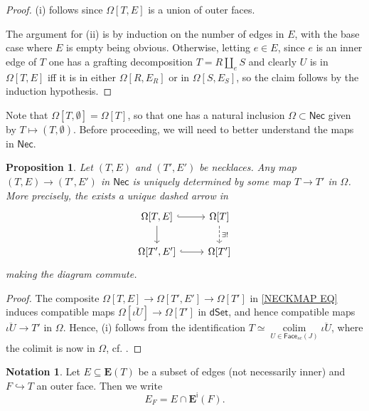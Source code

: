 \documentclass[a4paper,10pt
,draft
]{article}%
\numberwithin{equation}{section}
\numberwithin{figure}{section}
\newtheorem{proposition}[equation]{Proposition}%
\theoremstyle{definition} %
\newtheorem{notation}[equation]{Notation}%
\DeclareMathOperator{\colim}{colim}%
\newcommand{\1}{\ensuremath{\mathbbm 1}}%
\begin{document}
\begin{proof}
	(i) follows since $\Omega[T,E]$
	is a union of outer faces.
	
	The argument for (ii) is by induction on the number of edges in $E$,
	with the base case where $E$ is empty being obvious.
%	
	Otherwise, letting $e\in E$, since $e$ is an inner edge of $T$
	one has a grafting decomposition
	$T = R \amalg_e S$
	and clearly 
	$U$ is in $\Omega[T,E]$
	iff it is in either
	$\Omega[R,E_R]$ or in $\Omega[S,E_S]$,
	so the claim follows by the induction hypothesis.
\end{proof}




Note that 
$\Omega[T,\emptyset] = \Omega[T]$,
so that one has a natural inclusion
$\Omega \subset \mathsf{Nec}$
given by $T \mapsto (T,\emptyset)$.
Before proceeding, we will need to better understand the maps in 
$\mathsf{Nec}$.




\begin{proposition}
Let $(T,E)$ and $(T',E')$ be necklaces. 
Any map $(T,E) \to (T',E')$ in $\mathsf{Nec}$
is uniquely determined by some map 
$T \to T'$ in $\Omega$. 
More precisely, the exists a unique dashed arrow in 
\begin{equation}\label{NECKMAP EQ}
\begin{tikzcd}
	\Omega[T,E] 
	\ar[hookrightarrow]{r} 
	\ar{d}
&
	\Omega[T] 
	\ar[dashed]{d}{\exists !}
\\
	\Omega[T',E']
	\ar[hookrightarrow]{r}
&
	\Omega[T']
\end{tikzcd}
\end{equation}
making the diagram commute.
\end{proposition}

\begin{proof}
	The composite
	$\Omega[T,E] \to 
	\Omega[T',E'] \to 
	\Omega[T']$
	in \eqref{NECKMAP EQ}
	induces compatible maps
	$\Omega[\overline{\iota U}] \to \Omega[T']$
	in $\mathsf{dSet}$,
	and hence 
	compatible maps
	$\overline{\iota U} \to T'$
	in $\Omega$.
	Hence, (i) follows from the identification
	$T
	\simeq  
	\underset{U \in \mathsf{Face}_{sc}(J)}{\colim}
	\overline{\iota U}$, where the colimit is now in $\Omega$,
	cf. \cite[Cor. 3.70]{BP_geo}.
\end{proof}



\begin{notation}
	Let $E \subseteq \boldsymbol{E}(T)$
	be a subset of edges (not necessarily inner)
	and $F \hookrightarrow T$ an outer face.
	Then we write
	\[
	E_F = E \cap \boldsymbol{E}^{\mathsf{i}}(F).
	\]
\end{notation}
\end{document}

